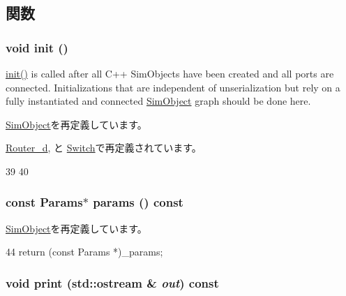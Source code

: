 \subsection{関数}
\hypertarget{classBasicRouter_a02fd73d861ef2e4aabb38c0c9ff82947}{
\subsubsection[{init}]{\setlength{\rightskip}{0pt plus 5cm}void init ()}}
\label{classBasicRouter_a02fd73d861ef2e4aabb38c0c9ff82947}
\hyperlink{classBasicRouter_a02fd73d861ef2e4aabb38c0c9ff82947}{init()} is called after all C++ SimObjects have been created and all ports are connected. Initializations that are independent of unserialization but rely on a fully instantiated and connected \hyperlink{classSimObject}{SimObject} graph should be done here. 

\hyperlink{classSimObject_a02fd73d861ef2e4aabb38c0c9ff82947}{SimObject}を再定義しています。

\hyperlink{classRouter__d_a02fd73d861ef2e4aabb38c0c9ff82947}{Router\_\-d}, と \hyperlink{classSwitch_a02fd73d861ef2e4aabb38c0c9ff82947}{Switch}で再定義されています。


\begin{DoxyCode}
39 {
40 }
\end{DoxyCode}
\hypertarget{classBasicRouter_acd3c3feb78ae7a8f88fe0f110a718dff}{
\subsubsection[{params}]{\setlength{\rightskip}{0pt plus 5cm}const {\bf Params}$\ast$ params () const}}
\label{classBasicRouter_acd3c3feb78ae7a8f88fe0f110a718dff}


\hyperlink{classSimObject_acd3c3feb78ae7a8f88fe0f110a718dff}{SimObject}を再定義しています。


\begin{DoxyCode}
44 { return (const Params *)_params; }
\end{DoxyCode}
\hypertarget{classBasicRouter_ac55fe386a101fbae38c716067c9966a0}{
\subsubsection[{print}]{\setlength{\rightskip}{0pt plus 5cm}void print (std::ostream \& {\em out}) const}}
\label{classBasicRouter_ac55fe386a101fbae38c716067c9966a0}


